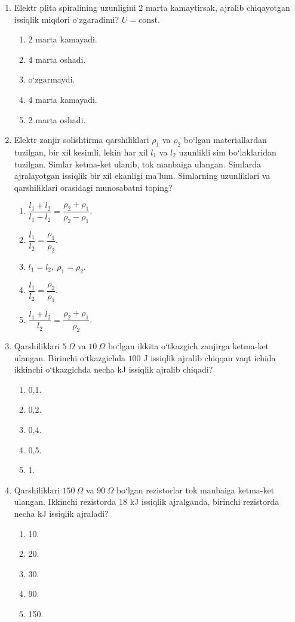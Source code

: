 \begin{enumerate}
\item Elektr plita spiralining uzunligini $2$ marta kamaytirsak, ajralib chiqayotgan issiqlik miqdori o‘zgaradimi? $U=\text{const}$.
\begin{enumerate}[label=\Alph*)]
\item 2 marta kamayadi.
\item 4 marta oshadi.
\item o‘zgarmaydi.
\item 4 marta kamayadi.
\item 2 marta oshadi.
\end{enumerate}

\item Elektr zanjir solishtirma qarshiliklari $\rho_1$ va $\rho_2$ bo‘lgan materiallardan tuzilgan, bir xil kesimli, lekin har xil $l_1$ va $l_2$ uzunlikli sim bo‘laklaridan tuzilgan. Simlar ketma-ket ulanib, tok manbaiga ulangan. Simlarda ajralayotgan issiqlik bir xil ekanligi ma’lum. Simlarning uzunliklari va qarshiliklari orasidagi munosabatni toping?
\begin{enumerate}[label=\Alph*)]
\item $\dfrac{l_1+l_2}{l_1-l_2}=\dfrac{\rho_2+\rho_1}{\rho_2-\rho_1}$.
\item $\dfrac{l_1}{l_2}=\dfrac{\rho_1}{\rho_2}$.
\item $l_1=l_2,\ \rho_1=\rho_2$.
\item $\dfrac{l_1}{l_2}=\dfrac{\rho_2}{\rho_1}$.
\item $\dfrac{l_1+l_2}{l_2}=\dfrac{\rho_2+\rho_1}{\rho_2}$.
\end{enumerate}

\item Qarshiliklari $5~\Omega$ va $10~\Omega$ bo‘lgan ikkita o‘tkazgich zanjirga ketma-ket ulangan. Birinchi o‘tkazgichda $100$ J issiqlik ajralib chiqqan vaqt ichida ikkinchi o‘tkazgichda necha kJ issiqlik ajralib chiqadi?
\begin{enumerate}[label=\Alph*)]
\item 0,1.
\item 0,2.
\item 0,4.
\item 0,5.
\item 1.
\end{enumerate}

\item Qarshiliklari $150~\Omega$ va $90~\Omega$ bo‘lgan rezistorlar tok manbaiga ketma-ket ulangan. Ikkinchi rezistorda $18$ kJ issiqlik ajralganda, birinchi rezistorda necha kJ issiqlik ajraladi?
\begin{enumerate}[label=\Alph*)]
\item 10.
\item 20.
\item 30.
\item 90.
\item 150.
\end{enumerate}


\end{enumerate}
